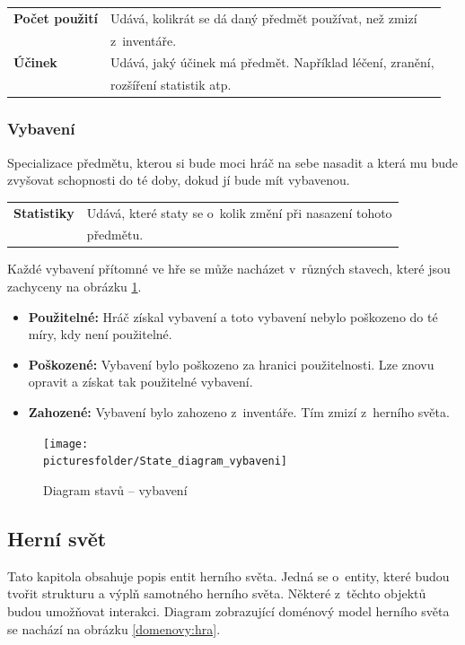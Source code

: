 \documentclass[12pt,a4paper]{article}
\def\picturesfolder{obrazky}
\begin{document}
\begin{tabular*}{0.87\textwidth}{ll}
  \bf Počet použití & Udává, kolikrát se dá daný předmět používat, než zmizí\\
                    & z~inventáře.\\[7pt]
  \bf Účinek & Udává, jaký účinek má předmět. Například léčení, zranění,\\
             & rozšíření statistik atp. \\[7pt]
\end{tabular*}

\subsubsection{Vybavení}
Specializace předmětu, kterou si bude moci hráč na sebe nasadit a která mu bude
zvyšovat schopnosti do té doby, dokud jí bude mít vybavenou.\\[5pt]

\begin{tabular*}{0.78\textwidth}{ll}
  \bf Statistiky & Udává, které staty se o~kolik změní při nasazení tohoto\\
  & předmětu.\\[7pt]
\end{tabular*}

Každé vybavení přítomné ve hře se může nacházet v~různých stavech, které jsou
zachyceny na obrázku \ref{stavy:vybaveni}.

\begin {itemize}
\item{\textbf{Použitelné:} Hráč získal vybavení a toto vybavení nebylo poškozeno
  do té míry, kdy není použitelné.}
\item{\textbf{Poškozené:} Vybavení bylo poškozeno za hranici použitelnosti. Lze
  znovu opravit a získat tak použitelné vybavení.}
\item{\textbf{Zahozené:} Vybavení bylo zahozeno z~inventáře. Tím zmizí z~herního
  světa.}
\end {itemize}

\begin{figure}
\begin{center}
  \texttt{[image: \\picturesfolder/State\_diagram\_vybaveni]}
  \caption{Diagram stavů -- vybavení}
  \label{stavy:vybaveni}
\end{center}
\end{figure}

\subsection{Herní svět}
Tato kapitola obsahuje popis entit herního světa. Jedná se o~entity, které budou
tvořit strukturu a výplň samotného herního světa. Některé z~těchto objektů budou
umožňovat interakci.  Diagram zobrazující doménový model herního světa se
nachází na obrázku \ref{domenovy:hra}.
\end{document}
